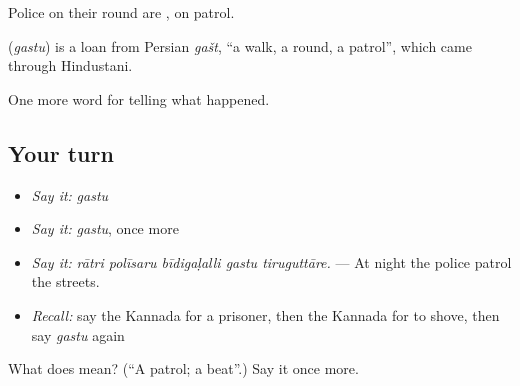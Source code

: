 Police on their round are , on patrol.

\begin{cousinweb}
\textbf{} (\emph{gastu}) is a loan from Persian \emph{gašt}, \textquotedblleft{}a walk, a round, a patrol\textquotedblright{}, which came through Hindustani.
\end{cousinweb}

\begin{grammarlens}[title={What you've built}]
One more word for telling what happened.
\end{grammarlens}

\subsection*{Your turn}
\begin{itemize}
\raggedright
  \item \emph{Say it:} \emph{gastu}
  \item \emph{Say it:} \emph{gastu}, once more
  \item \emph{Say it:} \emph{rātri polīsaru bīdigaḷalli gastu tiruguttāre.} — At night the police patrol the streets.
  \item \emph{Recall:} say the Kannada for a prisoner, then the Kannada for to shove, then say \emph{gastu} again
\end{itemize}

\begin{tcolorbox}[breakable,colback=teal!4,colframe=teal!35!black,title={Before you move on}]
What does  mean? (\textquotedblleft{}A patrol; a beat\textquotedblright{}.) Say it once more.
\end{tcolorbox}
